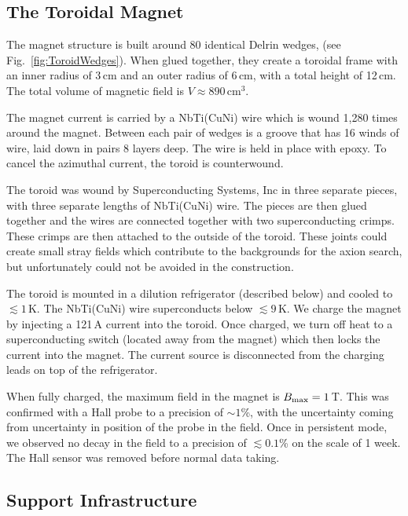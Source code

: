 \documentclass[aps,prd,amsmath,amssymb,reprint,superscriptaddress, nofootinbib,
]{revtex4-1}
\begin{document}
\subsection{The Toroidal Magnet}
\label{sec:TheMagnet}

The magnet structure is built around 80 identical Delrin wedges, (see Fig.~\ref{fig:ToroidWedges}). When glued together, they create a toroidal frame with an inner radius of 3\,cm and an outer radius of 6\,cm, with a total height of 12\,cm. The total volume of magnetic field is $V\approx890$\,cm$^3$.

The magnet current is carried by a NbTi(CuNi) wire which is wound 1,280 times around the magnet. Between each pair of wedges is a groove that has 16 winds of wire, laid down in pairs 8 layers deep. The wire is held in place with epoxy. To cancel the azimuthal current, the toroid is counterwound. 

The toroid was wound by Superconducting Systems, Inc \cite{SSI} in three separate pieces, with three separate lengths of NbTi(CuNi) wire. The pieces are then glued together and the wires are connected together with two superconducting crimps. These crimps are then attached to the outside of the toroid. These joints could create small stray fields which contribute to the backgrounds for the axion search, but unfortunately could not be avoided in the construction.

The toroid is mounted in a dilution refrigerator (described below) and cooled to $\lesssim1$\,K. The NbTi(CuNi) wire superconducts below $\lesssim9$\,K. We charge the magnet by injecting a 121\,A current into the toroid. Once charged, we turn off heat to a superconducting switch (located away from the magnet) which then locks the current into the magnet. The current source is disconnected from the charging leads on top of the refrigerator.

When fully charged, the maximum field in the magnet is $B_{\rm max}=1$\,T. This was confirmed with a Hall probe to a precision of $\sim1$\%, with the uncertainty coming from uncertainty in position of the probe in the field. Once in persistent mode, we observed no decay in the field to a precision of $\lesssim0.1$\% on the scale of 1 week. The Hall sensor was removed before normal data taking.

\subsection{Support Infrastructure}
\label{sec:ToroidSupport}
\end{document}
